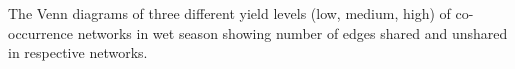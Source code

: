 The Venn diagrams of three different yield levels (low, medium, high) of co-occurrence networks in wet season showing number of edges shared and unshared in respective networks.